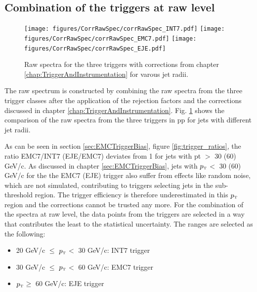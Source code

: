 \documentclass[ALICE]{ALICE_analysis_notes}
\newcommand{\pT}{$p_{\mbox{\tiny T}}$\xspace}
\newcommand{\pp}{pp\xspace}
\providecommand{\DIFaddend}{} %
\DeclareRobustCommand{\DIFaddend}{\DIFOaddend \let\includegraphics\DIFOincludegraphics} %
\begin{document}
\DIFaddend \subsection{Combination of the triggers at raw level}
\label{sec:triggerCombination}

\begin{figure}
    \centering
    \begin{multicols}{2}
            \texttt{[image: figures/CorrRawSpec/corrRawSpec\_INT7.pdf]}
            \texttt{[image: figures/CorrRawSpec/corrRawSpec\_EMC7.pdf]}
        \vfill\null 
        \columnbreak
            \texttt{[image: figures/CorrRawSpec/corrRawSpec\_EJE.pdf]}
        \vfill\null
    \end{multicols}
    \caption{Raw spectra for the three triggers with corrections from chapter \ref{chap:TriggerAndInstrumentation} for varous jet radii.}
    \label{fig:CorrRawSpec}
\end{figure}

The raw spectrum is constructed by combining the raw spectra from the three trigger classes after the application of the rejection factors and the corrections discussed in chapter \ref{chap:TriggerAndInstrumentation}. Fig. \ref{fig:CorrRawSpec} shows the comparison of the raw spectra from the three triggers in \pp for jets with different jet radii. 

As can be seen in section \ref{sec:EMCTriggerBias}, figure \ref{fig:trigger_ratios}, the ratio EMC7/INT7 (EJE/EMC7) deviates from 1 for jets with pt $>$ 30 (60) GeV/c. As discussed in chapter \ref{sec:EMCTriggerBias}, jets with \pT $<$ 30 (60) GeV/c for the the EMC7 (EJE) trigger also suffer from effects like random noise, which are not simulated, contributing to triggers selecting jets in the sub-threshold region. The trigger efficiency is therefore underestimated in this \pT region and the corrections cannot be trusted any more. For the combination of the spectra at raw level, the data points from the triggers are selected in a way that contributes the least to the statistical uncertainty. The ranges are selected as the following:

\begin{itemize}
    \item 20 GeV/c $\le$ \pT $<$ 30 GeV/c: INT7 trigger
    \item 30 GeV/c $\le$ \pT $<$ 60 GeV/c: EMC7 trigger
    \item \pT $\ge$ 60 GeV/c: EJE trigger
\end{itemize}
\end{document}
